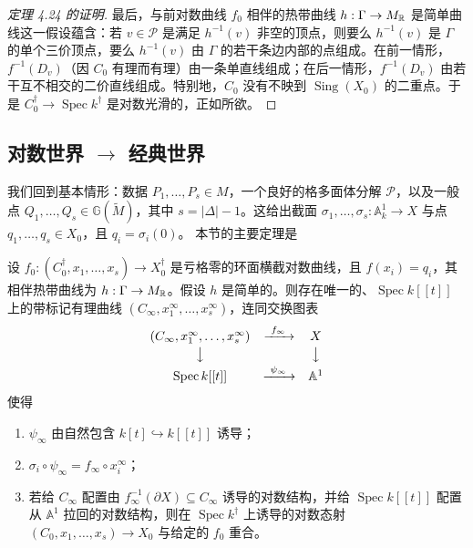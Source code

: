\begin{proof}[定理 4.24 的证明]
最后，与前对数曲线 $f_0$ 相伴的热带曲线 $h:\Gamma\to M_{\mathbb{R}}$ 是简单曲线这一假设蕴含：若 $v\in\mathcal P$ 是满足 $h^{-1}(v)$ 非空的顶点，则要么 $h^{-1}(v)$ 是 $\Gamma$ 的单个三价顶点，要么 $h^{-1}(v)$ 由 $\Gamma$ 的若干条边内部的点组成。在前一情形，$f^{-1}(D_v)$（因 $C_0$ 有理而有理）由一条单直线组成；在后一情形，$f^{-1}(D_v)$ 由若干互不相交的二价直线组成。特别地，$C_0$ 没有不映到 $\operatorname{Sing}(X_0)$ 的二重点。于是 $C^\dagger_0\to\operatorname{Spec}k^\dagger$ 是对数光滑的，正如所欲。
\end{proof}

\subsection{对数世界 $\to$ 经典世界}
我们回到基本情形：数据 $P_1,\dots,P_s\in M$，一个良好的格多面体分解 $\mathcal P$，以及一般点 $Q_1,\dots,Q_s\in\mathbb{G}(\widetilde M)$，其中 $s=|\Delta|-1$。这给出截面 $\sigma_1,\dots,\sigma_s:\mathbb{A}^1_k\to X$ 与点 $q_1,\dots,q_s\in X_0$，且 $q_i=\sigma_i(0)$。
本节的主要定理是

\begin{theorem}
设 $f_0:(C^\dagger_0,x_1,\dots,x_s)\to X^\dagger_0$ 是亏格零的环面横截对数曲线，且 $f(x_i)=q_i$，其相伴热带曲线为 $h:\Gamma\to M_{\mathbb{R}}$。假设 $h$ 是简单的。则存在唯一的、$\operatorname{Spec}k[[t]]$ 上的带标记有理曲线 $(C_\infty,x^\infty_1,\dots,x^\infty_s)$，连同交换图表
\[
\begin{array}{ccc}
(C_\infty,x^\infty_1,\dots,x^\infty_s) & \xrightarrow{\ f_\infty\ } & X\\[2pt]
\big\downarrow & & \big\downarrow\\[2pt]
\operatorname{Spec}k[[t]] & \xrightarrow{\ \psi_\infty\ } & \mathbb{A}^1
\end{array}
\]
使得
\begin{enumerate}[label=(\arabic*),leftmargin=2.2em]
\item $\psi_\infty$ 由自然包含 $k[t]\hookrightarrow k[[t]]$ 诱导；
\item $\sigma_i\circ\psi_\infty=f_\infty\circ x^\infty_i$；
\item 若给 $C_\infty$ 配置由 $f^{-1}_\infty(\partial X)\subseteq C_\infty$ 诱导的对数结构，并给 $\operatorname{Spec}k[[t]]$ 配置从 $\mathbb{A}^1$ 拉回的对数结构，则在 $\operatorname{Spec}k^\dagger$ 上诱导的对数态射 $(C_0,x_1,\dots,x_s)\to X_0$ 与给定的 $f_0$ 重合。
\end{enumerate}
\end{theorem}

